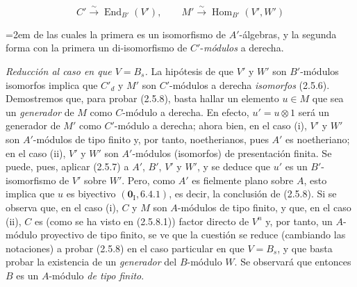 \begin{env}[2.5.8.6]
\label{IV.2.5.8.6-fr}
\[
C'\xrightarrow{\sim}\operatorname{End}_{B'}(V'),\qquad
M'\xrightarrow{\sim}\operatorname{Hom}_{B'}(V',W')
\]
{\emergencystretch=2em
de las cuales la primera es un isomorfismo de $A'$-álgebras, y la segunda
forma con la primera un di-isomorfismo de $C'$-\emph{módulos} a derecha.\par}
\end{env}

\begin{env}[2.5.8.7]
\label{IV.2.5.8.7-fr}
\emph{Reducción al caso en que $V=B_s$.} La hipótesis de que $V'$ y $W'$ son
$B'$-módulos isomorfos implica que $C'_d$ y $M'$ son $C'$-módulos a derecha
\emph{isomorfos} (2.5.6). Demostremos que, para probar (2.5.8), basta hallar un
elemento $u\in M$ que sea un \emph{generador} de $M$ como $C$-módulo a derecha. En
efecto, $u'=u\otimes1$ será un generador de $M'$ como $C'$-módulo a derecha;
ahora bien, en el caso (i), $V'$ y $W'$ son $A'$-módulos de tipo finito y, por
tanto, noetherianos, pues $A'$ es noetheriano; en el caso (ii), $V'$ y $W'$ son
$A'$-módulos (isomorfos) de presentación finita. Se puede, pues, aplicar (2.5.7)
a $A'$, $B'$, $V'$ y $W'$, y se deduce que $u'$ es un $B'$-isomorfismo de
$V'$ sobre $W'$. Pero, como $A'$ es fielmente plano sobre $A$, esto implica que
$u$ es biyectivo $(\mathbf{0}_{\mathrm I},6.4.1)$, es decir, la conclusión de (2.5.8).
Si se observa que, en el caso (i), $C$ y $M$ son $A$-módulos de tipo finito, y
que, en el caso (ii), $C$ es (como se ha visto en (2.5.8.1)) factor directo de
$V^n$ y, por tanto, un $A$-módulo proyectivo de tipo finito, se ve que la cuestión se reduce (cambiando las notaciones) a probar (2.5.8) en el caso particular en
que $V=B_s$, y que basta probar la existencia de un \emph{generador} del $B$-módulo
$W$. Se observará que entonces $B$ es un $A$-módulo \emph{de tipo finito}.
\end{env}

